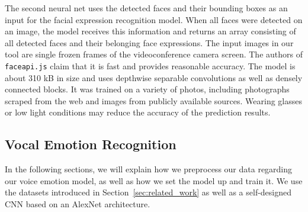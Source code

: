 The second neural net uses the detected faces and their bounding boxes as an input for the facial expression recognition model. When all faces were detected on an image, the model receives this information and returns an array consisting of all detected faces and their belonging face expressions. The input images in our tool are single frozen frames of the videoconference camera screen. The authors of \texttt{faceapi.js} claim that it is fast and provides reasonable accuracy. The model is about 310 kB in size and uses depthwise separable convolutions as well as densely connected blocks. It was trained on a variety of photos, including photographs scraped from the web and images from publicly available sources. Wearing glasses or low light conditions may reduce the accuracy of the prediction results.

\subsection{Vocal Emotion Recognition}
\label{subsec:method_vocal_emotion_recognition}
In the following sections, we will explain how we preprocess our data regarding our voice emotion model, as well as how we set the model up and train it. We use the datasets introduced in Section~\ref{sec:related_work} as well as a self-designed CNN based on an AlexNet architecture.

